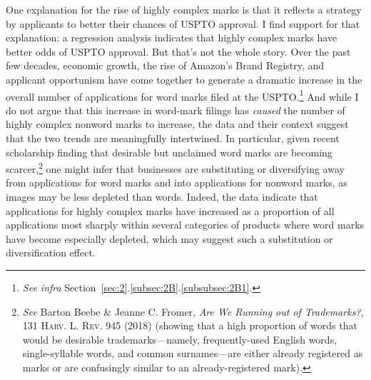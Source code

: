 \documentclass[letterpaper, 11pt, oneside]{article}
\begin{document}
One explanation for the rise of highly complex marks is that it reflects a strategy by applicants to better their chances of USPTO approval. I find support for that explanation: a regression analysis indicates that highly complex marks have better odds of USPTO approval. But that's not the whole story. Over the past few decades, economic growth, the rise of Amazon's Brand Registry, and applicant opportunism have come together to generate a dramatic increase in the overall number of applications for word marks filed at the USPTO.\footnote{\textit{See infra} Section~\ref{sec:2}.\ref{subsec:2B}.\ref{subsubsec:2B1}.} And while I do not argue that this increase in word-mark filings has \emph{caused} the number of highly complex nonword marks to increase, the data and their context suggest that the two trends are meaningfully intertwined. In particular, given recent scholarship finding that desirable but unclaimed word marks are becoming scarcer,\footnote{\label{supra4} \textit{See} Barton Beebe \& Jeanne C. Fromer, \textit{Are We Running out of Trademarks?}, 131 \textsc{Harv. L. Rev.} 945 (2018) (showing that a high proportion of words that would be desirable trademarks—namely, frequently-used English words, single-syllable words, and common surnames—are either already registered as marks or are confusingly similar to an already-registered mark).} one might infer that businesses are substituting or diversifying away from applications for word marks and into applications for nonword marks, as images may be less depleted than words. Indeed, the data indicate that applications for highly complex marks have increased as a proportion of all applications most sharply within several categories of products where word marks have become especially depleted, which may suggest such a substitution or diversification effect.
\end{document}
